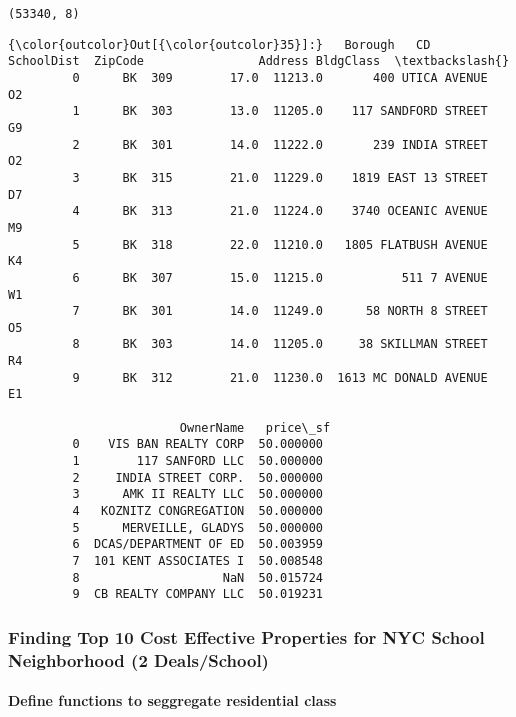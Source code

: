 \documentclass[11pt]{article}
\begin{document}
    \begin{Verbatim}[commandchars=\\\{\}]
(53340, 8)

    \end{Verbatim}

\begin{Verbatim}[commandchars=\\\{\}]
{\color{outcolor}Out[{\color{outcolor}35}]:}   Borough   CD  SchoolDist  ZipCode                Address BldgClass  \textbackslash{}
         0      BK  309        17.0  11213.0       400 UTICA AVENUE        O2   
         1      BK  303        13.0  11205.0    117 SANDFORD STREET        G9   
         2      BK  301        14.0  11222.0       239 INDIA STREET        O2   
         3      BK  315        21.0  11229.0    1819 EAST 13 STREET        D7   
         4      BK  313        21.0  11224.0    3740 OCEANIC AVENUE        M9   
         5      BK  318        22.0  11210.0   1805 FLATBUSH AVENUE        K4   
         6      BK  307        15.0  11215.0           511 7 AVENUE        W1   
         7      BK  301        14.0  11249.0      58 NORTH 8 STREET        O5   
         8      BK  303        14.0  11205.0     38 SKILLMAN STREET        R4   
         9      BK  312        21.0  11230.0  1613 MC DONALD AVENUE        E1   
         
                        OwnerName   price\_sf  
         0    VIS BAN REALTY CORP  50.000000  
         1        117 SANFORD LLC  50.000000  
         2     INDIA STREET CORP.  50.000000  
         3      AMK II REALTY LLC  50.000000  
         4   KOZNITZ CONGREGATION  50.000000  
         5      MERVEILLE, GLADYS  50.000000  
         6  DCAS/DEPARTMENT OF ED  50.003959  
         7  101 KENT ASSOCIATES I  50.008548  
         8                    NaN  50.015724  
         9  CB REALTY COMPANY LLC  50.019231  
\end{Verbatim}
            
    \subsubsection{Finding Top 10 Cost Effective Properties for NYC School
Neighborhood (2
Deals/School)}\label{finding-top-10-cost-effective-properties-for-nyc-school-neighborhood-2-dealsschool}

    \paragraph{Define functions to seggregate residential
class}\label{define-functions-to-seggregate-residential-class}
\end{document}
